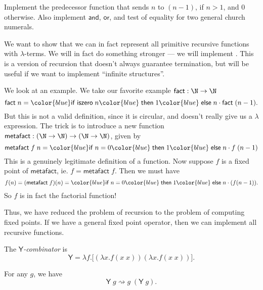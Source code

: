 \documentclass[a4paper]{article}
\newcommand\cif{{\color{blue} \mathsf{if}\;}}
\newcommand\cthen{{\color{blue}\;\mathsf{then}\;}}
\newcommand\celse{{\color{blue}\;\mathsf{else}\;}}
\newcommand\ciszero{\mathsf{iszero}}
\newcommand\cfact{\mathsf{fact}}
\newcommand\metafact{\mathsf{metafact}}
\newcommand\Yc{\mathsf{Y}}
\begin{document}
\begin{ex}
  Implement the predecessor function that sends $n$ to $(n - 1)$, if $n > 1$, and $0$ otherwise. Also implement $\mathsf{and}$, $\mathsf{or}$, and test of equality for two general church numerals. %
\end{ex}
We want to show that we can in fact represent all primitive recursive functions with $\lambda$-terms. We will in fact do something stronger --- we will implement . This is a version of recursion that doesn't always guarantee termination, but will be useful if we want to implement ``infinite structures''.

We look at an example. We take our favorite example $\cfact: \N \to \N$
\[
  \cfact\; n = \cif \ciszero \;n \cthen 1 \celse n \cdot \cfact\; (n - 1).
\]
But this is not a valid definition, since it is circular, and doesn't really give us a $\lambda$ expression. The trick is to introduce a new function $\metafact: (\N \to \N) \to (\N \to \N)$, given by
\[
  \metafact\; f\; n = \cif n = 0 \cthen 1 \celse n \cdot f\; (n - 1)
\]
This is a genuinely legitimate definition of a function. Now suppose $f$ is a fixed point of $\metafact$, ie. $f = \metafact\; f$. Then we must have
\[
  f(n) = (\metafact\; f)(n) = \cif n = 0\cthen 1 \celse n \cdot (f(n - 1)).
\]
So $f$ is in fact the factorial function!

Thus, we have reduced the problem of recursion to the problem of computing fixed points. If we have a general fixed point operator, then we can implement all recursive functions.

\begin{defi}[$\Yc$-combinator]\index{$\Yc$-combinator}
  The \emph{$\Yc$-combinator} is
  \[
    \Yc = \lambda f. \Big[ (\lambda x. f(x\; x)) (\lambda x. f(x\; x))\Big].
  \]
\end{defi}

\begin{thm}
  For any $g$, we have
  \[
    \Yc\; g \rightsquigarrow g\; (\Yc\; g).
  \]
\end{thm}
\end{document}
